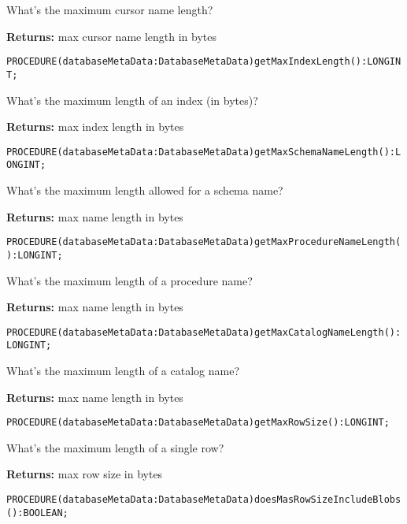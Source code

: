 What's the maximum cursor name length? 


{\bf Returns: } 
max cursor name length in bytes 




\verb'PROCEDURE(databaseMetaData:DatabaseMetaData)getMaxIndexLength():LONGINT;'






What's the maximum length of an index (in bytes)? 


{\bf Returns: } 
max index length in bytes 




\verb'PROCEDURE(databaseMetaData:DatabaseMetaData)getMaxSchemaNameLength():LONGINT;'






What's the maximum length allowed for a schema name? 


{\bf Returns: } 
max name length in bytes 




\verb'PROCEDURE(databaseMetaData:DatabaseMetaData)getMaxProcedureNameLength():LONGINT;'






What's the maximum length of a procedure name? 


{\bf Returns: } 
max name length in bytes 




\verb'PROCEDURE(databaseMetaData:DatabaseMetaData)getMaxCatalogNameLength():LONGINT;'






What's the maximum length of a catalog name? 


{\bf Returns: } 
max name length in bytes 




\verb'PROCEDURE(databaseMetaData:DatabaseMetaData)getMaxRowSize():LONGINT;'






What's the maximum length of a single row? 


{\bf Returns: } 
max row size in bytes 




\verb'PROCEDURE(databaseMetaData:DatabaseMetaData)doesMasRowSizeIncludeBlobs():BOOLEAN;'






